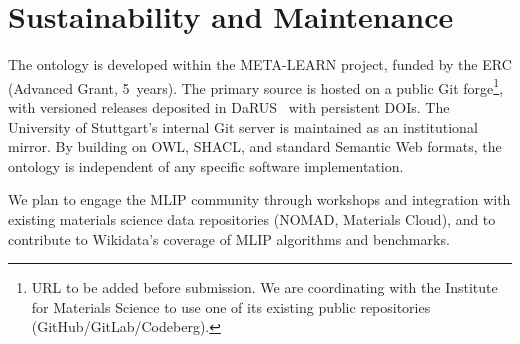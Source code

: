 \section{Sustainability and Maintenance}
\label{sec:sustainability}

The ontology is developed within the META-LEARN project, funded by the
ERC (Advanced Grant, 5~years). The primary source is hosted on a
public Git forge\footnote{URL to be added before submission. We are
coordinating with the Institute for Materials Science to use one of
its existing public repositories
(GitHub/GitLab/Codeberg).}, with versioned releases deposited in
DaRUS~\cite{darus2024} with persistent DOIs. The University of
Stuttgart's internal Git server is maintained as an institutional
mirror.  By building on OWL, SHACL, and standard Semantic Web
formats, the ontology is independent of any specific software
implementation.

We plan to engage the MLIP community through workshops and integration with
existing materials science data repositories (NOMAD, Materials Cloud), and
to contribute to Wikidata's coverage of MLIP algorithms and benchmarks.

